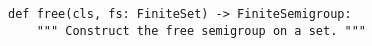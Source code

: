 \begin{verbatim}
def free(cls, fs: FiniteSet) -> FiniteSemigroup:
    """ Construct the free semigroup on a set. """
\end{verbatim}